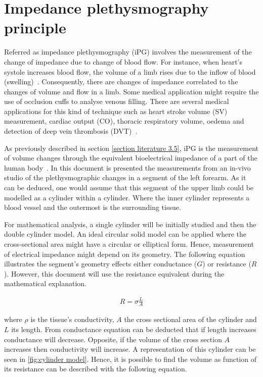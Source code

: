 \section{Impedance plethysmography principle} %
\label{section impedance 1}
Referred as impedance plethysmography (iPG) involves the measurement of the change of impedance due to change of blood flow. For instance, when heart’s systole increases blood flow, the volume of a limb rises due to the inflow of blood (swelling)~\cite{martinsen2011bioimpedance}. Consequently, there are changes of impedance correlated to the changes of volume and flow in a limb. Some medical application might require the use of occlusion cuffs to analyse venous filling. There are several medical applications for this kind of technique such as heart stroke volume (SV) measurement, cardiac output (CO), thoracic respiratory volume, oedema and detection of deep vein thrombosis (DVT)~\cite{holohan1996plethysmography}.

As previously described in section \ref{section literature 3.5}, iPG is the measurement of volume changes through the equivalent bioelectrical impedance of a part of the human body~\cite{corciova2011peripheral}. In this document is presented the measurements from an in-vivo studio of the plethysmographic changes in a segment of the left forearm. As it can be deduced, one would assume that this segment of the upper limb could be modelled as a cylinder within a cylinder. Where the inner cylinder represents a blood vessel and the outermost is the surrounding tissue. 

For mathematical analysis, a single cylinder will be initially studied and then the double cylinder model. An ideal circular solid model can be applied where the cross-sectional area might have a circular or elliptical form. Hence, measurement of electrical impedance might depend on its geometry. The following equation illustrates the segment’s geometry effects either conductance ($G$) or resistance ($R$). However, this document will use the resistance equivalent during the mathematical explanation.

\begin{align}
\label{eq:resistivity}
R=\sigma\frac{L}{A}
\end{align}

where $\rho$ is the tissue’s conductivity, $A$ the cross sectional area of the cylinder and $L$ its length. From conductance equation can be deducted that if length increases conductance will decrease. Opposite, if the volume of the cross section $A$ increases then conductivity will increase. A representation of this cylinder can be seen in \ref{fig:cylinder model}. Hence, it is possible to find the volume as function of its resistance can be described with the following equation.

